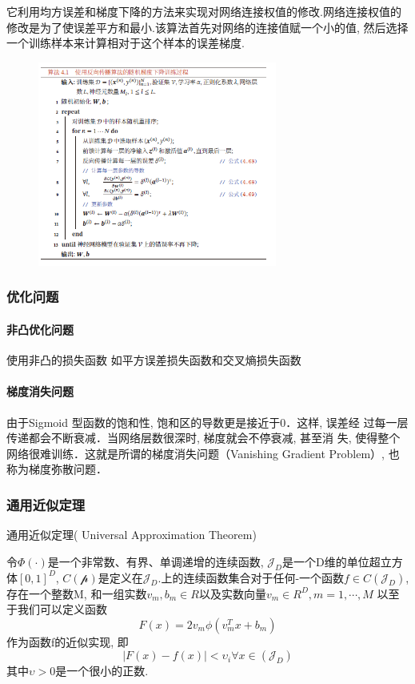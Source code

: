 \documentclass[a4paper]{article}
\theoremstyle{definition}
\numberwithin{equation}{section}
\begin{document}
它利用均方误差和梯度下降的方法来实现对网络连接权值的修改.网络连接权值的修改是为了使误差平方和最小.该算法首先对网络的连接值赋一个小的值, 然后选择一个训练样本来计算相对于这个样本的误差梯度.
\begin{figure}
    \centering
    \includegraphics[width=0.7\textwidth]{algorithm_bp.png}
\end{figure} 

\subsubsection{优化问题}
\paragraph{非凸优化问题}
使用非凸的损失函数
如平方误差损失函数和交叉熵损失函数
\paragraph{梯度消失问题}
由于Sigmoid 型函数的饱和性, 饱和区的导数更是接近于0．这样, 误差经
过每一层传递都会不断衰减．当网络层数很深时, 梯度就会不停衰减, 甚至消
失, 使得整个网络很难训练．这就是所谓的梯度消失问题（Vanishing Gradient
Problem）, 也称为梯度弥散问题．

\subsubsection{通用近似定理}
通用近似定理( Universal Approximation Theorem) 

令$\Phi(\cdot)$是一个非常数、有界、单调递增的连续函数,  $\mathcal{J}_D$是一个D维的单位超立方体$[0, 1]^D$,  $C(\mathcal{p})$是定义在$\mathcal{J}_D$.上的连续函数集合对于任何-一个函数$f \in C(\mathcal{J}_D)$, 存在一个整数M, 和一组实数$v_m, b_m \in R$以及实数向量$v_m \in R^D, m= 1,  \cdots,  M$ 以至于我们可以定义函数
$$F(x) =2v_m \phi(v_m^T x + b_m)$$
作为函数f的近似实现, 即
$$|F(x)- f(x)|< \upsilon_i \forall x \in (\mathcal{J}_D) $$
其中$ \upsilon > 0$是一个很小的正数.
\end{document}
